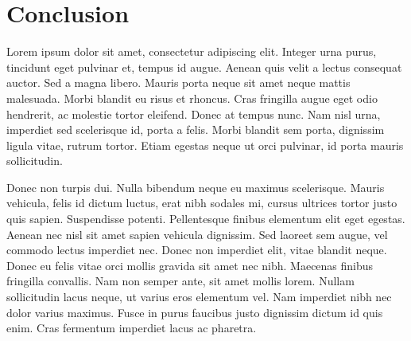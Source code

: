 \section{Conclusion}
Lorem ipsum dolor sit amet, consectetur adipiscing elit. Integer urna purus, tincidunt eget pulvinar et, tempus id augue. Aenean quis velit a lectus consequat auctor. Sed a magna libero. Mauris porta neque sit amet neque mattis malesuada. Morbi blandit eu risus et rhoncus. Cras fringilla augue eget odio hendrerit, ac molestie tortor eleifend. Donec at tempus nunc. Nam nisl urna, imperdiet sed scelerisque id, porta a felis. Morbi blandit sem porta, dignissim ligula vitae, rutrum tortor. Etiam egestas neque ut orci pulvinar, id porta mauris sollicitudin.

Donec non turpis dui. Nulla bibendum neque eu maximus scelerisque. Mauris vehicula, felis id dictum luctus, erat nibh sodales mi, cursus ultrices tortor justo quis sapien. Suspendisse potenti. Pellentesque finibus elementum elit eget egestas. Aenean nec nisl sit amet sapien vehicula dignissim. Sed laoreet sem augue, vel commodo lectus imperdiet nec. Donec non imperdiet elit, vitae blandit neque. Donec eu felis vitae orci mollis gravida sit amet nec nibh. Maecenas finibus fringilla convallis. Nam non semper ante, sit amet mollis lorem. Nullam sollicitudin lacus neque, ut varius eros elementum vel. Nam imperdiet nibh nec dolor varius maximus. Fusce in purus faucibus justo dignissim dictum id quis enim. Cras fermentum imperdiet lacus ac pharetra.